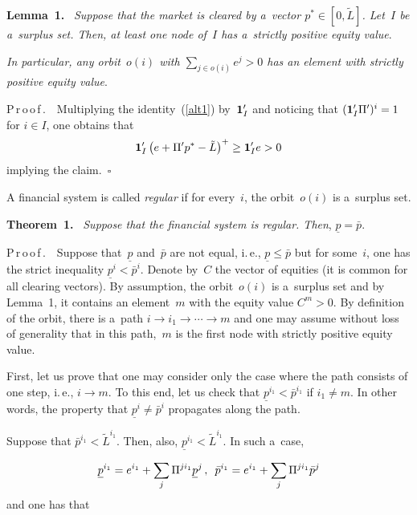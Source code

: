 \begin{multicols}{2}
\noindent
\textbf{Lemma~1.}\
 \textit{Suppose that the market is cleared by a~vector $p^*\in [0,\tilde L]$. Let~$I$ 
be a~surplus set.  Then, at least one node of~$I$ has a~strictly positive equity 
value}.

\textit{In particular,
any orbit~$o(i)$ with $\sum_{j\in o(i)}e^j>0$ has an element with strictly  
positive equity value}.

\smallskip

\noindent
P\,r\,o\,o\,f\,.\ \  Multiplying the identity~(\ref{alt1}) by~${\bf 1}'_I$ and noticing 
that
$({\bf 1}'_I\Pi')^i=1$ for $i\in I$,
one obtains that
$$
{\bf 1}'_I \left(e+\Pi'p^*-\tilde L\right)^+\ge {\bf 1}'_I e>0
$$
implying the claim.~$\square$

\smallskip

A financial system is called \textit{regular} if for  every~$i$, the orbit~$o(i)$ is 
a~surplus set.

\smallskip

\noindent
\textbf{Theorem~1.}\
\textit{Suppose that the financial system is regular.
Then}, $\underline p=\bar p$.

\smallskip

\noindent
P\,r\,o\,o\,f\,.\ \  Suppose that~$\underline p$ and~$\bar p$ are not equal, i.\,e., 
$\underline p\le \bar p$ but for some~$i$, one 
has the strict inequality  $\underline p^i<\bar p^i$.
Denote by~$C$ the vector of equities (it is common for all clearing vectors).
By assumption, the orbit~$o(i)$ is a~surplus set and by Lemma~1, it 
contains an element~$m$ with the equity value $C^m>0$. By definition of the 
orbit, there is a~path $i\to i_1\to \cdots \to m$ and one may assume without loss of 
generality that in this path,~$m$ is  the first node with strictly positive 
equity value.

First, let us prove that  one may consider only the case where the path
consists of one step,  i.\,e., $i\to m$.  To this end, let us check that
$\underline p^{i_1}<\bar p^{i_1}$ if $i_1\neq m$. In other words, the property 
that $\underline p^i\neq \bar p^i$ propagates along the path.

Suppose that $\bar p^{i_1}< \tilde L^{i_1}$. Then, also, $\underline p^{i_1}< 
\tilde L^{i_1}$.  In such a~case,

\vspace*{3pt}

\noindent
$$
 \underline p^{i_1}=e^{i_1}+ \sum\limits_j\Pi^{ji_1}\underline p^j\,, \enskip \bar 
p^{i_1}=e^{i_1}+\sum\limits_j\Pi^{ji_1}\bar p^j
$$
and one has  that


\end{multicols}
